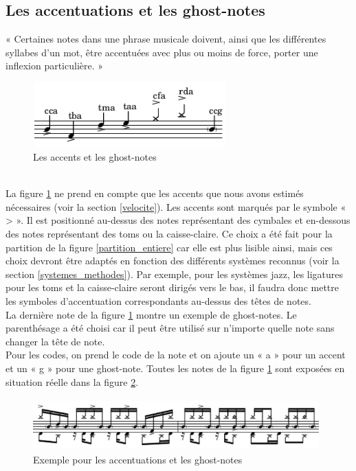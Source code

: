 \subsection*{Les accentuations et les ghost-notes}
« Certaines notes dans une phrase musicale doivent, ainsi que les différentes syllabes d’un mot, être accentuées avec plus ou moins de force, porter une inflexion particulière. » \cite{danhauser}
\begin{figure}[h]
	\centering
	\includegraphics[height=25mm, width=75mm]{z_images/3_methodes/0_notation_de_la_batterie/8_nuances_0.png}
	\caption{Les accents et les ghost-notes}
	\label{accents_et_gn}
\end{figure}\\
La figure \ref{accents_et_gn} ne prend en compte que les accents que nous avons estimés nécessaires (voir la section \ref{velocite}). Les accents sont marqués par le symbole « > ». Il est positionné au-dessus des notes représentant des cymbales et en-dessous des notes représentant des toms ou la caisse-claire. Ce choix a été fait pour la partition de la figure \ref{partition_entiere} car elle est plus lisible ainsi, mais ces choix devront être adaptés en fonction des différents systèmes reconnus (voir la section \ref{systemes_methodes}). Par exemple, pour les systèmes jazz, les ligatures pour les toms et la caisse-claire seront dirigés vers le bas, il faudra donc mettre les symboles d’accentuation correspondants au-dessus des têtes de notes.\\
La dernière note de la figure \ref{accents_et_gn} montre un exemple de ghost-notes. Le parenthésage a été choisi car il peut être utilisé sur n’importe quelle note sans changer la tête de note.\\
Pour les codes, on prend le code de la note et on ajoute un « a » pour un accent et un « g » pour une ghost-note. Toutes les notes de la figure \ref{accents_et_gn} sont exposées en situation réelle dans la figure \ref{exemple_acc_et_gn}. 
\begin{figure}[h]
	\centering
	\includegraphics[height=20mm, width=110mm]{z_images/3_methodes/0_notation_de_la_batterie/8_nuances_1.png}
	\caption{Exemple pour les accentuations et les ghost-notes}
	\label{exemple_acc_et_gn}
\end{figure}\newpage
